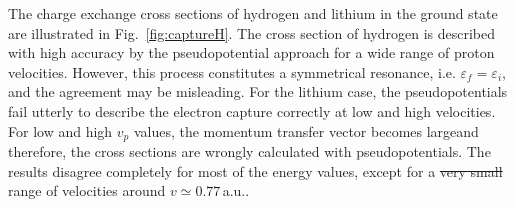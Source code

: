 \documentclass[10pt]{article}
\providecommand{\DIFaddtex}[1]{{\protect\color{blue}\uwave{#1}}} %
\providecommand{\DIFdeltex}[1]{{\protect\color{red}\sout{#1}}}                      %
\providecommand{\DIFaddbegin}{} %
\providecommand{\DIFaddend}{} %
\providecommand{\DIFdelbegin}{} %
\providecommand{\DIFdelend}{} %
\providecommand{\DIFadd}[1]{\texorpdfstring{\DIFaddtex{#1}}{#1}} %
\providecommand{\DIFdel}[1]{\texorpdfstring{\DIFdeltex{#1}}{}} %
\newcommand{\DIFscaledelfig}{0.5}
\newlength{\DIFdelgraphicswidth} %
\newlength{\DIFdelgraphicsheight} %
\newcommand{\DIFaddincludegraphics}[2][]{{\color{blue}\fbox{\DIFOincludegraphics[#1]{#2}}}} %
\newcommand{\DIFdelincludegraphics}[2][]{%
\sbox{\DIFdelgraphicsbox}{\DIFOincludegraphics[#1]{#2}}%
\settoboxwidth{\DIFdelgraphicswidth}{\DIFdelgraphicsbox} %
\settoboxtotalheight{\DIFdelgraphicsheight}{\DIFdelgraphicsbox} %
\scalebox{\DIFscaledelfig}{%
\parbox[b]{\DIFdelgraphicswidth}{\usebox{\DIFdelgraphicsbox}\\[-\baselineskip] \rule{\DIFdelgraphicswidth}{0em}}\llap{\resizebox{\DIFdelgraphicswidth}{\DIFdelgraphicsheight}{%
\setlength{\unitlength}{\DIFdelgraphicswidth}%
\begin{picture}(1,1)%
\thicklines\linethickness{2pt} %
{\color[rgb]{1,0,0}\put(0,0){\framebox(1,1){}}}%
{\color[rgb]{1,0,0}\put(0,0){\line( 1,1){1}}}%
{\color[rgb]{1,0,0}\put(0,1){\line(1,-1){1}}}%
\end{picture}%
}\hspace*{3pt}}} %
} %
\DeclareRobustCommand{\DIFaddbegin}{\DIFOaddbegin \let\includegraphics\DIFaddincludegraphics} %
\DeclareRobustCommand{\DIFaddend}{\DIFOaddend \let\includegraphics\DIFOincludegraphics} %
\DeclareRobustCommand{\DIFdelbegin}{\DIFOdelbegin \let\includegraphics\DIFdelincludegraphics} %
\DeclareRobustCommand{\DIFdelend}{\DIFOaddend \let\includegraphics\DIFOincludegraphics} %
\begin{document}
The charge exchange cross sections of hydrogen and lithium in the 
ground state are illustrated in Fig.~\ref{fig:captureH}. The cross 
section of hydrogen is described with high accuracy by the 
pseudopotential approach for a wide range of proton velocities. 
However, this process constitutes 
a symmetrical resonance, i.e. $\varepsilon_{\!f}=\varepsilon_{\!i}$, 
and the agreement may be misleading. For the lithium case, the 
pseudopotentials fail utterly to describe the electron capture 
correctly at low and high velocities. For low and high $v_p$ values, the 
momentum transfer vector becomes large\DIFaddbegin \DIFadd{, }\DIFaddend and therefore, the cross 
sections are wrongly calculated with pseudopotentials. 
The results disagree completely for most of the energy values, except
for a \DIFdelbegin \DIFdel{very small }\DIFdelend \DIFaddbegin \DIFadd{minimal }\DIFaddend range of velocities around $v\simeq0.77$\,a.u..
\end{document}
